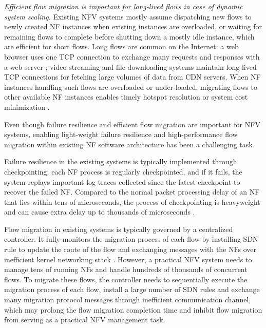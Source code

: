 {\em Efficient flow migration \cite{rajagopalan2013split, gember2015opennf, qazi2017high} is important for long-lived flows in case of dynamic system scaling.} Existing NFV systems \cite{palkar2015e2, gember2012stratos} mostly assume dispatching new flows to newly created NF instances when existing instances are overloaded, or waiting for remaining flows to complete before shutting down a mostly idle instance, which are efficient for short flows. Long flows are common on the Internet:  a web browser uses one TCP connection to exchange many requests and responses with a web server \cite{http-keep-alive}; video-streaming \cite{ffmpeg} and file-downloading \cite{ftp} systems maintain long-lived TCP connections for fetching large volumes of data from CDN servers. When NF instances handling such flows are overloaded or under-loaded, migrating flows to other available NF instances enables timely hotspot resolution or system cost minimization \cite{gember2015opennf}.

Even though failure resilience and efficient flow migration are important for NFV systems, enabling light-weight failure resilience and high-performance flow migration within existing NF software architecture has been a challenging task.

Failure resilience in the existing systems \cite{sherry2015rollback,rajagopalan2013pico} is typically implemented through checkpointing: each NF process is regularly checkpointed, and if it fails, the system replays important log traces collected since the latest checkpoint to recover the failed NF. Compared to the normal packet processing delay of an NF that lies within tens of microseconds, the process of checkpointing is heavyweight and can cause extra delay up to thousands of microseconds \cite{sherry2015rollback, rajagopalan2013pico}.

Flow migration in existing systems \cite{rajagopalan2013split, gember2015opennf} is typically governed by a centralized controller. It fully monitors the migration process of each flow by installing SDN rule to update the route of the flow and exchanging messages with the NFs over inefficient kernel networking stack \cite{netmap}. However, a practical NFV system needs to manage tens of running NFs and handle hundreds of thousands of concurrent flows. To migrate these flows, the controller needs to sequentially execute the migration process of each flow, install a large number of SDN rules and exchange many migration protocol messages through inefficient communication channel, which may prolong the flow migration completion time and inhibit flow migration from serving as a practical NFV management task.

